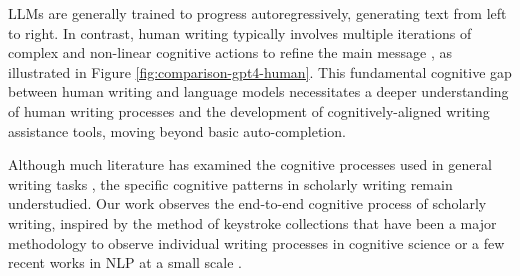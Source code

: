 LLMs are generally trained to progress autoregressively, generating text from left to right. In contrast, human writing typically involves multiple iterations of complex and non-linear cognitive actions to refine the main message \cite{f508427a-e4c0-3d6a-8abf-03a5d21ec6c4, koo2023decoding}, as illustrated in Figure \ref{fig:comparison-gpt4-human}. 
This fundamental cognitive gap between human writing and language models necessitates a deeper understanding of human writing processes and the development of cognitively-aligned writing assistance tools, moving beyond basic auto-completion.







Although much literature has examined the cognitive processes used in general writing tasks \cite{lindgren2003stimulated, hayes2014cognitive, zhu2023insights, Wengelin2023}, the specific cognitive patterns in scholarly writing remain understudied. Our work observes the end-to-end cognitive process of scholarly writing, inspired by the method of keystroke collections that have been a major methodology to observe individual writing processes \cite{doi:10.1177/0741088312451108, latif2008state, leijten2013keystroke} in cognitive science or a few recent works in NLP at a small scale \cite{koo2023decoding, velentzas2024logging}. 

